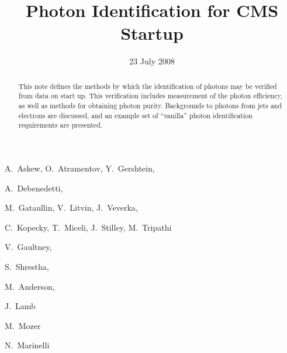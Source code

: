 \documentclass{cmspaper}
\begin{document}

\begin{titlepage}

   \date{23 July 2008}

  \title{Photon Identification for CMS Startup}

  \begin{Authlist}
    A.~Askew, O.~Atramentov, Y.~Gershtein,

    A.~Debenedetti,

    M.~Gataullin, V.~Litvin, J.~Veverka, 

    C.~Kopecky, T.~Miceli, J.~Stilley, M.~Tripathi

    V.~Gaultney,

    S.~Shrestha,

    M.~Anderson,

    J.~Lamb

    M.~Mozer

    N.~Marinelli

  \end{Authlist}


  \begin{abstract}
This note defines the methods by which the identification of photons may be verified from data
on start up.  This verification includes measurement of the photon efficiency, as well as methods
for obtaining photon purity.  Backgrounds to photons from jets and electrons are discussed, and an
example set of ``vanilla'' photon identification requirements are presented. 
  \end{abstract} 

  
\end{titlepage}
\tableofcontents
\listoffigures
\listoftables
\pagebreak
\end{document}
